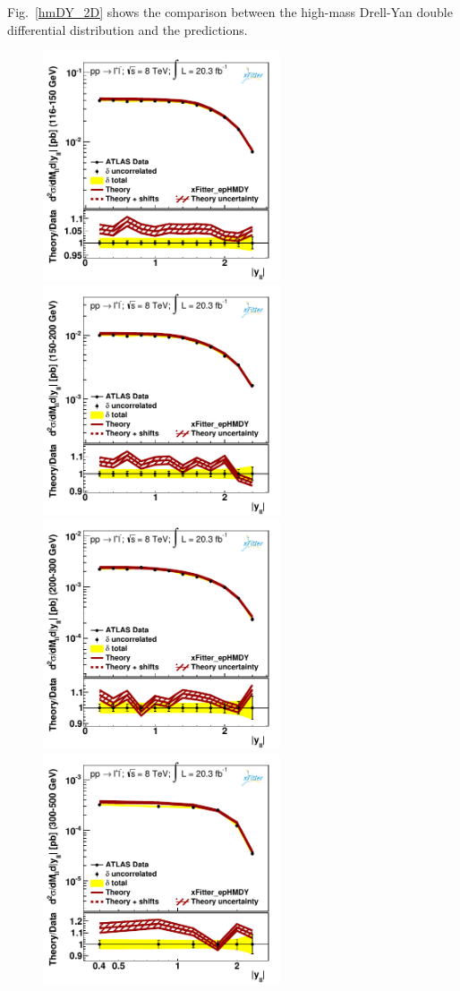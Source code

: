 Fig.~\ref{hmDY_2D} 
shows the comparison between the high-mass Drell-Yan double differential distribution and 
the predictions.
\begin{figure}
\centering
\includegraphics[width=7cm]{data_1.pdf} 
\includegraphics[width=7cm]{data_2.pdf} 
\includegraphics[width=7cm]{data_3.pdf} 
\includegraphics[width=7cm]{data_4.pdf} 

\end{figure}
